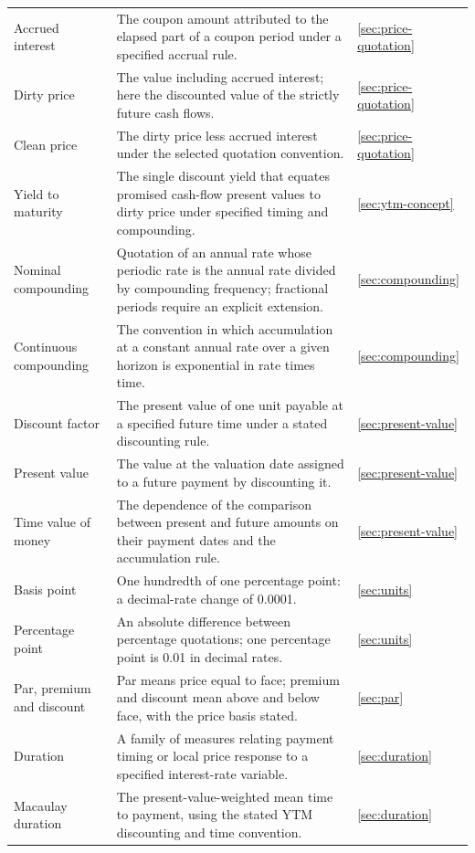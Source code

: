 \begin{longtable}{@{}L{0.22\textwidth}L{0.58\textwidth}L{0.12\textwidth}@{}}
Accrued interest & The coupon amount attributed to the elapsed part of a coupon period under a specified accrual rule. & \ref{sec:price-quotation}\\
Dirty price & The value including accrued interest; here the discounted value of the strictly future cash flows. & \ref{sec:price-quotation}\\
Clean price & The dirty price less accrued interest under the selected quotation convention. & \ref{sec:price-quotation}\\
Yield to maturity & The single discount yield that equates promised cash-flow present values to dirty price under specified timing and compounding. & \ref{sec:ytm-concept}\\
Nominal compounding & Quotation of an annual rate whose periodic rate is the annual rate divided by compounding frequency; fractional periods require an explicit extension. & \ref{sec:compounding}\\
Continuous compounding & The convention in which accumulation at a constant annual rate over a given horizon is exponential in rate times time. & \ref{sec:compounding}\\
Discount factor & The present value of one unit payable at a specified future time under a stated discounting rule. & \ref{sec:present-value}\\
Present value & The value at the valuation date assigned to a future payment by discounting it. & \ref{sec:present-value}\\
Time value of money & The dependence of the comparison between present and future amounts on their payment dates and the accumulation rule. & \ref{sec:present-value}\\
Basis point & One hundredth of one percentage point: a decimal-rate change of 0.0001. & \ref{sec:units}\\
Percentage point & An absolute difference between percentage quotations; one percentage point is 0.01 in decimal rates. & \ref{sec:units}\\
Par, premium and discount & Par means price equal to face; premium and discount mean above and below face, with the price basis stated. & \ref{sec:par}\\
Duration & A family of measures relating payment timing or local price response to a specified interest-rate variable. & \ref{sec:duration}\\
Macaulay duration & The present-value-weighted mean time to payment, using the stated YTM discounting and time convention. & \ref{sec:duration}\\

\end{longtable}
